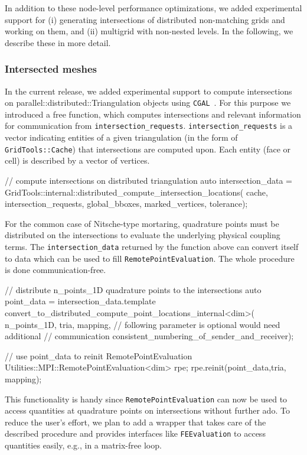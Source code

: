 \documentclass{ansarticle-preprint}
\begin{document}
In addition to these node-level performance optimizations, we added experimental
support for (i) generating intersections of distributed
non-matching grids and working on them,
and (ii) multigrid with non-nested levels. In the following, we describe these
in more detail.

\subsubsection{Intersected meshes}
In the current release, we added experimental support to compute intersections on parallel::distributed::Triangulation objects using \texttt{CGAL}~\cite{cgal-user-ref}.
For this purpose we introduced a free function, which computes intersections and relevant information for communication from \texttt{intersection\_requests}.
\texttt{intersection\_requests} is a vector indicating entities of a given triangulation (in the form of \texttt{GridTools::Cache}) that intersections are computed upon.
Each entity (face or cell) is described by a vector of vertices.

\begin{c++}
// compute intersections on distributed triangulation  
auto intersection_data =
       GridTools::internal::distributed_compute_intersection_locations(
         cache, intersection_requests, global_bboxes, marked_vertices,
         tolerance);
\end{c++}

For the common case of Nitsche-type mortaring, quadrature points must be distributed on the intersections to evaluate the underlying physical coupling terms.
The \texttt{intersection\_data} returned by the function above can convert itself to data which can be used to fill \texttt{RemotePointEvaluation}.
The whole procedure is done communication-free.

\begin{c++}
// distribute n_points_1D quadrature points to the intersections
auto point_data = intersection_data.template 
       convert_to_distributed_compute_point_locations_internal<dim>(
         n_points_1D, tria, mapping,
         // following parameter is optional would need additional
         // communication 
         consistent_numbering_of_sender_and_receiver);

// use point_data to reinit RemotePointEvaluation
Utilities::MPI::RemotePointEvaluation<dim> rpe;
rpe.reinit(point_data,tria, mapping);
\end{c++}

This functionality is handy since \texttt{RemotePointEvaluation} can now be used to access quantities at quadrature points on intersections without further ado.
To reduce the user's effort, we plan to add a wrapper that takes care of the described procedure and provides interfaces like \texttt{FEEvaluation} to access quantities easily, e.g., in a matrix-free loop.
\end{document}
